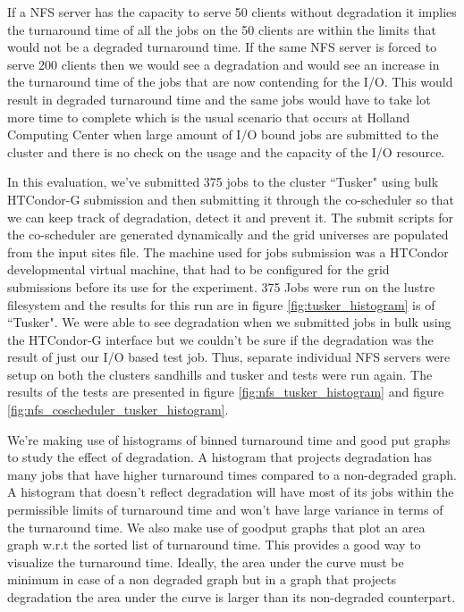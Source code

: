 \documentclass[ms,electronic,double]{nuthesis}
\begin{document}
If a NFS server has the capacity to serve 50 clients without degradation it
implies the turnaround time of all the jobs on the 50 clients are within the 
limits that would not be a degraded turnaround time. If the same NFS server is forced to serve 200 
clients then we would see a degradation and would see an increase in the turnaround time of the jobs
that are now contending for the I/O. This would result in degraded turnaround time and 
the same jobs would have to take lot more time to complete which is the usual 
scenario that occurs at Holland Computing Center when large amount of I/O bound 
jobs are submitted to the cluster and there is no check on the usage and the 
capacity of the I/O resource.

In this evaluation, we've submitted 375 jobs to the cluster ``Tusker" using bulk 
HTCondor-G submission and then submitting it through the co-scheduler so that we 
can keep track of degradation, detect it and prevent it. The submit scripts for 
the co-scheduler are generated dynamically and the grid universes are populated 
from the input sites file. The machine used for jobs submission was a 
HTCondor developmental virtual machine, that had to be configured for the grid 
submissions before its use for the experiment. 375 Jobs were run on the lustre 
filesystem and the results for this run are in figure \ref{fig:tusker_histogram} is 
of ``Tusker". We were able to see degradation when we 
submitted jobs in bulk using the HTCondor-G interface but we couldn't be sure if the 
degradation was the result of just our I/O based test job. Thus, separate 
individual NFS servers were setup on both the clusters sandhills and tusker and 
tests were run again. The results of the tests are presented in figure \ref{fig:nfs_tusker_histogram} 
and figure \ref{fig:nfs_coscheduler_tusker_histogram}.

We're making use of histograms of binned turnaround time and good 
put graphs to study the effect of degradation. A histogram that projects 
degradation has many jobs that have higher turnaround times compared to a non-degraded graph. A histogram that doesn't reflect degradation will have most of 
its jobs within the permissible limits of turnaround time and won't have large 
variance in terms of the turnaround time. We also make use of goodput graphs 
that plot an area graph w.r.t the sorted list of turnaround time. This provides a good way to 
visualize the turnaround time. Ideally, the area under the curve must be minimum 
in case of a non degraded graph but in a graph that projects degradation the 
area under the curve is larger than its non-degraded counterpart.
\newpage
\end{document}
